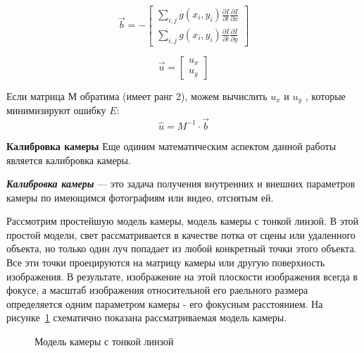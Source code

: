 $$
\vec{b} = -
\left[ 	
\begin{array}{c}
\sum \limits_{i,j} g(x_i, y_i) 
			\frac{\partial I}{\partial t} 										\frac{\partial I}{\partial x}  \\ 
\sum \limits_{i,j} g(x_i, y_i) 
			\frac{\partial I}{\partial t} 										\frac{\partial I}{\partial y}
\end{array} 
\right]
$$

$$
\vec{u} = 
\left[ 	
\begin{array}{c}
  u_x\\ 
	u_y
\end{array} 
\right]
$$

Если матрица М обратима (имеет ранг 2), можем вычислить $u_x$ и $u_y$ , которые минимизируют ошибку $E$\cite{habrOpticalFlowAbout}:
$$
\widehat{u} = M^{-1} \cdot \vec{b}
$$

\textbf{Калибровка камеры}
Еще одиним математическим аспектом данной работы является калибровка камеры. 

\textit{\textbf{Калибровка камеры}} — это задача получения внутренних и внешних параметров камеры по имеющимся фотографиям или видео, отснятым ей\cite{wikiCalibrate}.

Рассмотрим простейшую модель камеры, модель камеры с тонкой линзой. В этой простой модели, свет рассматривается в качестве потка от сцены или удаленного объекта, но только один луч попадает из любой конкретный точки этого объекта. Все эти точки проецируются на матрицу камеры или другую поверхность изображения. В результате, изображение на этой плоскости изображения всегда в фокусе, а масштаб изображения относительной его раельного размера определяется одним параметром камеры -  его фокусным расстоянием. На рисунке~\ref{pic:cameraModel} схематично показана рассматриваемая модель камеры\cite{openCVBook}. 

\begin{figure}[!htb]
\caption{Модель камеры с тонкой линзой}
\label{pic:cameraModel}
\end{figure}

